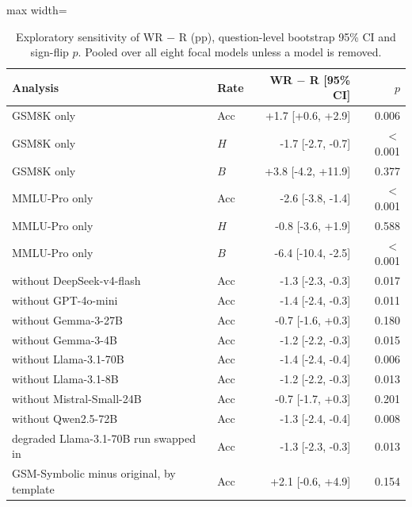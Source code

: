 \begin{table}[t]
\centering
\caption{Exploratory sensitivity of WR $-$ R (pp), question-level bootstrap 95\% CI and sign-flip $p$. Pooled over all eight focal models unless a model is removed.}
\label{tab:robust}
\begin{adjustbox}{max width=\linewidth}
\small
\begin{tabular}{@{}llrr@{}}
\toprule
Analysis & Rate & WR $-$ R [95\% CI] & $p$ \\
\midrule
GSM8K only & Acc & +1.7 [+0.6, +2.9] & 0.006 \\
GSM8K only & $H$ & -1.7 [-2.7, -0.7] & $<$0.001 \\
GSM8K only & $B$ & +3.8 [-4.2, +11.9] & 0.377 \\
MMLU-Pro only & Acc & -2.6 [-3.8, -1.4] & $<$0.001 \\
MMLU-Pro only & $H$ & -0.8 [-3.6, +1.9] & 0.588 \\
MMLU-Pro only & $B$ & -6.4 [-10.4, -2.5] & $<$0.001 \\
\midrule
without DeepSeek-v4-flash & Acc & -1.3 [-2.3, -0.3] & 0.017 \\
without GPT-4o-mini & Acc & -1.4 [-2.4, -0.3] & 0.011 \\
without Gemma-3-27B & Acc & -0.7 [-1.6, +0.3] & 0.180 \\
without Gemma-3-4B & Acc & -1.2 [-2.2, -0.3] & 0.015 \\
without Llama-3.1-70B & Acc & -1.4 [-2.4, -0.4] & 0.006 \\
without Llama-3.1-8B & Acc & -1.2 [-2.2, -0.3] & 0.013 \\
without Mistral-Small-24B & Acc & -0.7 [-1.7, +0.3] & 0.201 \\
without Qwen2.5-72B & Acc & -1.3 [-2.4, -0.4] & 0.008 \\
degraded Llama-3.1-70B run swapped in & Acc & -1.3 [-2.3, -0.3] & 0.013 \\
\midrule
GSM-Symbolic minus original, by template & Acc & +2.1 [-0.6, +4.9] & 0.154 \\
\bottomrule
\end{tabular}
\end{adjustbox}
\end{table}
